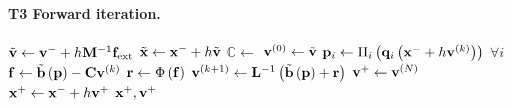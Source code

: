 \paragraph{T3 Forward iteration.}\mbox{}
\begin{algorithm}[H]
\caption{V2: one PD step with contact (\textsc{Forward} as in Alg.~\ref{alg:npd_v1}).}
\label{alg:npd_v2}
\begin{algorithmic}[1]
    \State $\tilde{\mathbf{v}} \gets \mathbf{v}^- + h\mathbf{M}^{-1}\mathbf{f}_{\text{ext}}$
    \State $\tilde{\mathbf{x}} \gets \mathbf{x}^- + h\tilde{\mathbf{v}}$
    \State $\mathbb{C} \gets$  
    \State $\mathbf{v}^{(0)} \gets \tilde{\mathbf{v}}$
        \State $\mathbf{p}_i \gets \Pi_i\left(\mathbf{q}_i\left(\mathbf{x}^- + h\mathbf{v}^{(k)}\right)\right)$ \quad $\forall i$ 
        \State $\mathbf{f} \gets \tilde{\mathbf{b}}\left(\mathbf{p}\right) - \mathbf{C}\mathbf{v}^{(k)}$
        \State $\mathbf{r} \gets \Phi\left(\mathbf{f}\right)$ 
        \State $\mathbf{v}^{(k+1)} \gets \mathbf{L}^{-1}\left(\tilde{\mathbf{b}}\left(\mathbf{p}\right) + \mathbf{r}\right)$ 
    \EndFor
    \State $\mathbf{v}^+ \gets \mathbf{v}^{(N)}$
    \State $\mathbf{x}^+ \gets \mathbf{x}^- + h\mathbf{v}^+$
    \State \Return $\mathbf{x}^+, \mathbf{v}^+$
\EndFunction
\end{algorithmic}
\end{algorithm}

